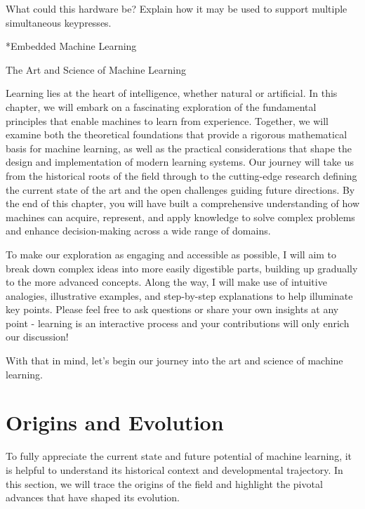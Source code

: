 \documentclass[
  9pt,
  letterpaper,
  abstract,
  titlepage]{scrbook}
\makeatletter
\renewcommand\chapter{\clearpage\global\@topnum\z@
\@afterindentfalse \secdef\@chapter\@schapter}
\renewcommand{\part}[1]{%
    \chapter*{#1} %
    \addcontentsline{toc}{part}{#1} %
}
\newif\if@firstnumbered%
\newif\if@firstunnumbered%
\newcounter{lastRomanPage}
\let\old@chapter\chapter%
\renewcommand{\chapter}{%
  \@ifstar{\unnumbered@chapter}{\numbered@chapter}%
}
\newcommand{\numbered@chapter}[1]{%
  \if@firstnumbered%
    \cleardoublepage%
    \setcounter{lastRomanPage}{\value{page}}%
    \pagenumbering{arabic}%
    \@firstnumberedfalse%
  \else
    \setcounter{page}{\value{page}}%
  \fi
  \old@chapter{#1}%
}
\newcommand{\unnumbered@chapter}[1]{%
  \if@firstunnumbered%
    \clearpage
    \setcounter{lastRomanPage}{\value{page}}%
    \pagenumbering{roman}%
    \@firstunnumberedfalse%
  \fi
  \old@chapter*{#1}%
}
\makeatother
\begin{document}
What could this hardware be? Explain how it may be used to support
multiple simultaneous keypresses.

\part{Embedded Machine Learning}

\chapter{The Art and Science of Machine
Learning}\label{the-art-and-science-of-machine-learning}

Learning lies at the heart of intelligence, whether natural or
artificial. In this chapter, we will embark on a fascinating exploration
of the fundamental principles that enable machines to learn from
experience. Together, we will examine both the theoretical foundations
that provide a rigorous mathematical basis for machine learning, as well
as the practical considerations that shape the design and implementation
of modern learning systems. Our journey will take us from the historical
roots of the field through to the cutting-edge research defining the
current state of the art and the open challenges guiding future
directions. By the end of this chapter, you will have built a
comprehensive understanding of how machines can acquire, represent, and
apply knowledge to solve complex problems and enhance decision-making
across a wide range of domains.

To make our exploration as engaging and accessible as possible, I will
aim to break down complex ideas into more easily digestible parts,
building up gradually to the more advanced concepts. Along the way, I
will make use of intuitive analogies, illustrative examples, and
step-by-step explanations to help illuminate key points. Please feel
free to ask questions or share your own insights at any point - learning
is an interactive process and your contributions will only enrich our
discussion!

With that in mind, let's begin our journey into the art and science of
machine learning.

\section{Origins and Evolution}\label{origins-and-evolution}

To fully appreciate the current state and future potential of machine
learning, it is helpful to understand its historical context and
developmental trajectory. In this section, we will trace the origins of
the field and highlight the pivotal advances that have shaped its
evolution.
\end{document}
